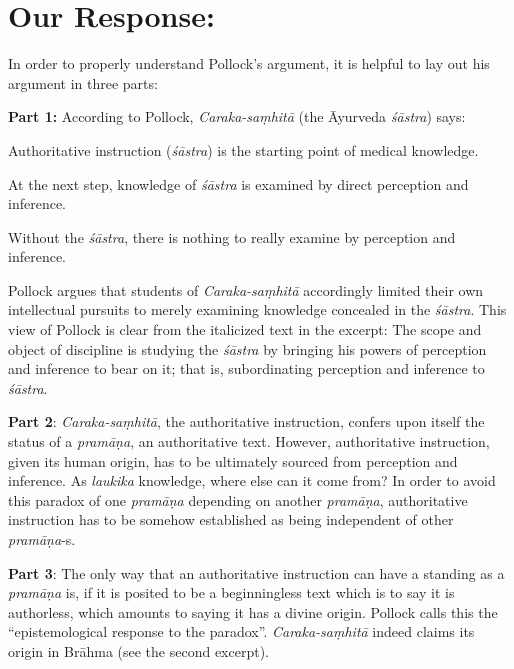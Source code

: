 \section*{Our Response:}

In order to properly understand Pollock's argument, it is helpful to lay out his argument in three parts:

{\bf Part 1:}
According to Pollock, {\sl Caraka-saṃhitā} (the Āyurveda {\sl śāstra}) says:
\begin{myquote}
Authoritative instruction ({\sl śāstra}) is the starting point of medical knowledge. 

At the next step, knowledge of {\sl śāstra} is examined by direct perception and inference.

Without the {\sl śāstra}, there is nothing to really examine by perception and inference.  
\end{myquote}

\newpage

Pollock argues that students of {\sl Caraka-saṃhitā} accordingly limited their own intellectual pursuits to merely examining knowledge concealed in the {\sl śāstra}.  This view of Pollock is clear from the italicized text in the excerpt: The scope and object of discipline is studying the {\sl śāstra} by bringing his powers of perception and inference to bear on it; that is, subordinating perception and inference to {\sl śāstra}.

{\bf Part 2}: {\sl Caraka-saṃhitā}, the authoritative instruction, confers upon itself the status of a {\sl pramāṇa}, an authoritative text.  However, authoritative instruction, given its human  origin, has to be ultimately sourced from perception and inference.  As {\sl laukika} knowledge, where else can it come from? In order to avoid this paradox of one {\sl pramāṇa} depending on another {\sl pramāṇa}, authoritative instruction has to be somehow established as being independent of other {\sl pramāṇa}-s.

{\bf Part 3}: The only way that an authoritative instruction can have a standing as a {\sl pramāṇa} is, if it is posited to be a beginningless text which is to say it is authorless, which amounts to saying it has a divine origin.  Pollock calls this the ``epistemological response to the paradox''. {\sl Caraka-saṃhitā} indeed claims its origin in Brāhma (see the second excerpt).

